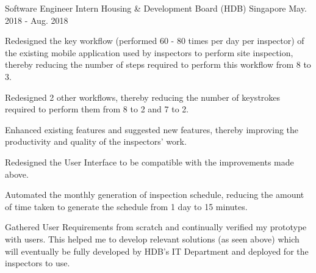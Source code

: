 

\begin{cventries}

  \cventry
    {Software Engineer Intern} %
    {Housing \& Development Board (HDB)} %
    {Singapore} %
    {May. 2018 - Aug. 2018} %
    {
      \begin{cvitems} %
        \item {Redesigned the key workflow (performed 60 - 80 times per day per inspector) of the existing mobile application used by inspectors to perform site inspection, thereby reducing the number of steps required to perform this workflow from 8 to 3.}
        \item {Redesigned 2 other workflows, thereby reducing the number of keystrokes required to perform them from 8 to 2 and 7 to 2.}
        \item {Enhanced existing features and suggested new features, thereby improving the productivity and quality of the inspectors' work.}
        \item {Redesigned the User Interface to be compatible with the improvements made above.}
        \item {Automated the monthly generation of inspection schedule, reducing the amount of time taken to generate the schedule from 1 day to 15 minutes.}
        \item {Gathered User Requirements from scratch and continually verified my prototype with users. This helped me to develop relevant solutions (as seen above) which will eventually be fully developed by HDB's IT Department and deployed for the inspectors to use.}
      \end{cvitems}
    }


\end{cventries}
